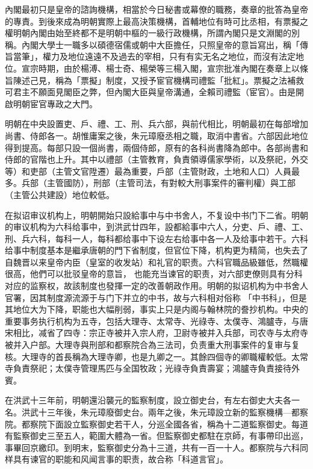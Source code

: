 內閣最初只是皇帝的諮詢機構，相當於今日秘書或幕僚的職務，奏章的批答為皇帝的專責。到後來成為明朝實際上最高決策機構，首輔地位有時可比丞相，有票擬之權明朝內閣由始至終都不是明朝中樞的一級行政機構，所謂內閣只是文淵閣的別稱。內閣大學士一職多以碩德宿儒或朝中大臣擔任，只照皇帝的意旨寫出，稱「傳旨當筆」，權力及地位遠遠不及過去的宰相，只有有实无名之地位，而沒有法定地位。宣宗時期，由於楊溥、楊士奇、楊榮等三楊入閣，宣宗批准內閣在奏章上以條旨陳述己見，稱為「票擬」制度，又授予宦官機構司禮監「批紅」。票擬之法補救可君主不願面見閣臣之弊，但內閣大臣與皇帝溝通，全賴司禮監（宦官）。由是開啟明朝宦官專政之大門。

明朝在中央設置吏、戶、禮、工、刑、兵六部，與前代相比，明朝最初在每部增加尚書、侍郎各一。胡惟庸案之後，朱元璋廢丞相之職，取消中書省。六部因此地位得到提高。每部只設一個尚書，兩個侍郎，原有的各科尚書降為郎中。各部尚書和侍郎的官階也上升。其中以禮部（主管教育，負責領導儒家學術，以及祭祀，外交等）和吏部（主管文官陞遷）最為重要，戶部（主管財政，土地和人口）人員最多。兵部（主管國防），刑部（主管司法，有對較大刑事案件的審判權）與工部（主管公共建設）地位較低。

在拟诏审议机构上，明朝開始只設給事中与中书舍人，不复设中书门下二省。明朝的审议机构为六科给事中，到洪武廿四年，設都給事中六人，分吏、戶、禮、工、刑、兵六科，每科一人，每科都给事中下设左右给事中各一人及给事中若干。六科给事中制度基本是繼承唐朝的門下省制度，但官位下降，机构更为精简，也失去了自魏晋以来皇帝内臣（皇室的收发站）和礼官的职责。六科官職品級雖低，然職權很高，他們可以批驳皇帝的意旨， 也能充当谏官的职责，对六部吏僚则具有分科对应的监察权，故該制度也發揮一定的改善朝政作用。明朝的拟诏机构为中书舍人官署，因其制度源流源于与门下并立的中书，故与六科相对俗称 「中书科」，但是其地位大为下降，职能也大幅削弱，事实上只是内阁与翰林院的誊抄机构。中央的重要事务执行机构为五寺，包括大理寺、太常寺、光祿寺、太僕寺、鴻臚寺，与唐宋相比，减省了四寺：宗正寺被并入宗人府，卫尉寺被并入兵部，司农寺与太府寺被并入户部。大理寺與刑部和都察院合為三法司，负责重大刑事案件的复审与复核。大理寺的首長稱為大理寺卿，也是九卿之一。其餘四個寺的卿職權較低。太常寺負責祭祀；太僕寺管理馬匹与全国牧政；光祿寺負責壽宴；鴻臚寺負責接待外賓。

在洪武十三年前，明朝還沿襲元的監察制度，設立御史台，有左右御史大夫各一名。洪武十三年後，朱元璋廢御史台。兩年之後，朱元璋設立新的監察機構—都察院。都察院下面設立監察御史若干人，分巡全國各省，稱為十二道監察御史。每道有監察御史三至五人，範圍大體為一省。但監察御史都駐在京師，有事帶印出巡，事畢回京繳印。到明末，監察御史分為十三道，共有一百一十人。都察院与六科同样具有谏官的职能和风闻言事的职责，故合称「科道言官」。


